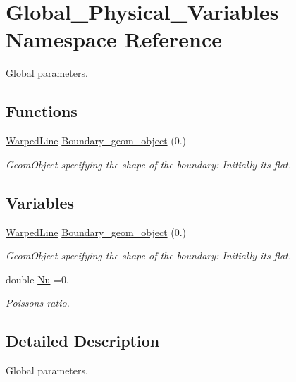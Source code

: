 \hypertarget{namespaceGlobal__Physical__Variables}{}\section{Global\+\_\+\+Physical\+\_\+\+Variables Namespace Reference}
\label{namespaceGlobal__Physical__Variables}


Global parameters.  


\subsection*{Functions}
\begin{DoxyCompactItemize}
\item 
\hyperlink{classWarpedLine}{Warped\+Line} \hyperlink{namespaceGlobal__Physical__Variables_ab0a184463cbaaa353f2235411adef3c4}{Boundary\+\_\+geom\+\_\+object} (0.)
\begin{DoxyCompactList}\small\item\em Geom\+Object specifying the shape of the boundary\+: Initially it\textquotesingle{}s flat. \end{DoxyCompactList}\end{DoxyCompactItemize}
\subsection*{Variables}
\begin{DoxyCompactItemize}
\item 
\hyperlink{classWarpedLine}{Warped\+Line} \hyperlink{namespaceGlobal__Physical__Variables_ab0a184463cbaaa353f2235411adef3c4}{Boundary\+\_\+geom\+\_\+object} (0.)
\begin{DoxyCompactList}\small\item\em Geom\+Object specifying the shape of the boundary\+: Initially it\textquotesingle{}s flat. \end{DoxyCompactList}\item 
double \hyperlink{namespaceGlobal__Physical__Variables_a9e06f4ada334a9a911aa8cdcfb3ff30b}{Nu} =0.
\begin{DoxyCompactList}\small\item\em Poisson\textquotesingle{}s ratio. \end{DoxyCompactList}\end{DoxyCompactItemize}


\subsection{Detailed Description}
Global parameters. 

